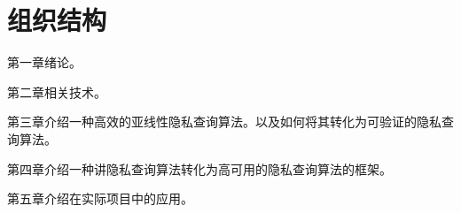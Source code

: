 \section{组织结构}

第一章绪论。

第二章相关技术。

第三章介绍一种高效的亚线性隐私查询算法。以及如何将其转化为可验证的隐私查询算法。

第四章介绍一种讲隐私查询算法转化为高可用的隐私查询算法的框架。

第五章介绍在实际项目中的应用。